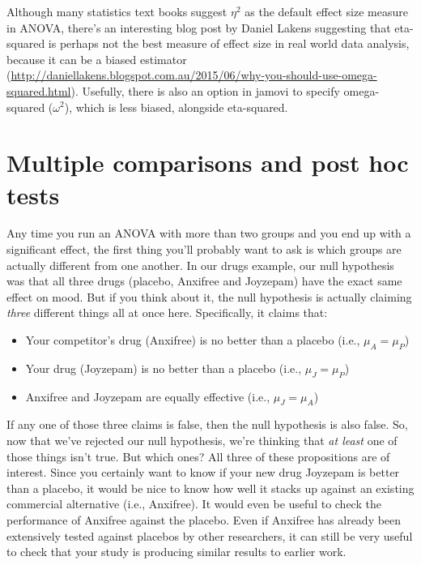 Although many statistics text books suggest $\eta^2$ as the default effect size measure in ANOVA, there's an interesting blog post by Daniel Lakens suggesting that eta-squared is perhaps not the best measure of effect size in real world data analysis, because it can be a biased estimator (\url{http://daniellakens.blogspot.com.au/2015/06/why-you-should-use-omega-squared.html}). Usefully, there is also an option in jamovi to specify omega-squared ($\omega^2$), which is less biased, alongside eta-squared.


\section{Multiple comparisons and post hoc tests~\label{sec:posthoc}}





%
%


Any time you run an ANOVA with more than two groups and you end up with a significant effect, the first thing you'll probably want to ask is which groups are actually different from one another. In our drugs example, our null hypothesis was that all three drugs (placebo, Anxifree and Joyzepam) have the exact same effect on mood. But if you think about it, the null hypothesis is actually claiming {\it three} different things all at once here. Specifically, it claims that:
\begin{itemize} \itemsep 0pt
\item Your competitor's drug (Anxifree) is no better than a placebo (i.e., $\mu_A = \mu_P$)
\item Your drug (Joyzepam) is no better than a placebo (i.e., $\mu_J = \mu_P$)
\item Anxifree and Joyzepam are equally effective (i.e., $\mu_J = \mu_A$)
\end{itemize}
If any one of those three claims is false, then the null hypothesis is also false. So, now that we've rejected our null hypothesis, we're thinking that {\it at least} one of those things isn't true. But which ones? All three of these propositions are of interest. Since you certainly want to know if your new drug Joyzepam is better than a placebo, it would be nice to know how well it stacks up against an existing commercial alternative (i.e., Anxifree). It would even be useful to check the performance of Anxifree against the placebo. Even if Anxifree has already been extensively tested against placebos by other researchers, it can still be very useful to check that your study is producing similar results to earlier work.

